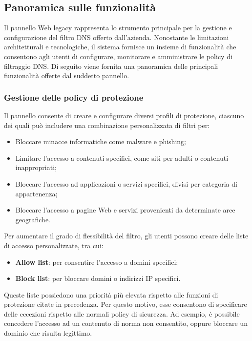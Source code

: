 \subsection{Panoramica sulle funzionalità}
Il pannello Web legacy rappresenta lo strumento principale per la gestione e configurazione del filtro DNS offerto dall'azienda. Nonostante le limitazioni architetturali e tecnologiche, il sistema fornisce un insieme di funzionalità che consentono agli utenti di configurare, monitorare e amministrare le policy di filtraggio DNS. Di seguito viene fornita una panoramica delle principali funzionalità offerte dal suddetto pannello.

\subsubsection{Gestione delle policy di protezione}
Il pannello consente di creare e configurare diversi profili di protezione, ciascuno dei quali può includere una combinazione personalizzata di filtri per:
\begin{itemize}
  \item Bloccare minacce informatiche come malware e phishing;
  \item Limitare l'accesso a contenuti specifici, come siti per adulti o contenuti inappropriati;
  \item Bloccare l'accesso ad applicazioni o servizi specifici, divisi per categoria di appartenenza;
  \item Bloccare l'accesso a pagine Web e servizi provenienti da determinate aree geografiche.
\end{itemize}
Per aumentare il grado di flessibilità del filtro, gli utenti possono creare delle liste di accesso personalizzate, tra cui:
\begin{itemize}
  \item \textbf{Allow list}: per consentire l'accesso a domini specifici;
  \item \textbf{Block list}: per bloccare domini o indirizzi IP specifici.
\end{itemize}
Queste liste possiedono una priorità più elevata rispetto alle funzioni di protezione citate in precedenza. Per questo motivo, esse consentono di specificare delle eccezioni rispetto alle normali policy di sicurezza. Ad esempio, è possibile concedere l'accesso ad un contenuto di norma non consentito, oppure bloccare un dominio che risulta legittimo.

